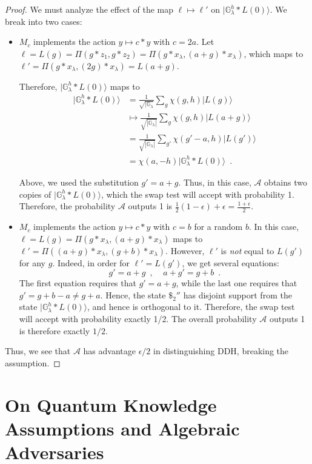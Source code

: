 \documentclass{article}\usepackage[a4paper,margin=20mm]{geometry}
\numberwithin{theorem}{section}
\numberwithin{equation}{section}
\newcommand{\G}{\mathbb{G}}
\newcommand{\As}{{\mathcal{A}}}
\begin{document}
\begin{proof}
	We must analyze the effect of the map $\ell\mapsto\ell'$ on $|\G_\lambda^{h}*L(0)\rangle$. We break into two cases:
	\begin{itemize}
		\item $M_c$ implements the action $y\mapsto c*y$ with $c=2a$. Let $\ell=L(g)=\Pi(g*z_1,g*z_2)=\Pi(g*x_\lambda,(a+g)*x_\lambda)$, which maps to $\ell'=\Pi(g*x_\lambda,(2g)*x_\lambda)=L(a+g)$.
		
		Therefore, $|\G_\lambda^{h}*L(0)\rangle$ maps to
		\begin{align*}|\G_\lambda^{h}*L(0)\rangle&=\frac{1}{\sqrt{|\G_\lambda}}\sum_g \chi(g,h)|L(g)\rangle\\&\mapsto\frac{1}{\sqrt{|\G_\lambda|}}\sum_g \chi(g,h)|L(a+g)\rangle\\&=\frac{1}{\sqrt{|\G_\lambda|}}\sum_{g'} \chi(g'-a,h)|L(g')\rangle\\&=\chi(a,-h)|\G_\lambda^{h}*L(0)\rangle\enspace .\end{align*}
		
		Above, we used the substitution $g'=a+g$. Thus, in this case, $\As$ obtains two copies of $|\G_\lambda^{h}*L(0)\rangle$, which the swap test will accept with probability 1. Therefore, the probability $\As$ outputs 1 is $\frac{1}{2}(1-\epsilon)+\epsilon=\frac{1+\epsilon}{2}$.
		
		
		\item $M_c$ implements the action $y\mapsto c*y$ with $c=b$ for a random $b$. In this case, $\ell=L(g)=\Pi(g*x_\lambda,(a+g)*x_\lambda)$ maps to $\ell'=\Pi((a+g)*x_\lambda,(g+b)*x_\lambda)$. However, $\ell'$ is \emph{not} equal to $L(g')$ for any $g$. Indeed, in order for $\ell'=L(g')$, we get several equations:
		\[g'=a+g\enspace ,\;\;\;\;a+g'=g+b\enspace .\]
		The first equation requires that $g'=a+g$, while the last one requires that $g'=g+b-a\neq g+a$. Hence, the state $\$_2''$ has disjoint support from the state $|\G_\lambda^{h}*L(0)\rangle$, and hence is orthogonal to it. Therefore, the swap test will accept with probability exactly 1/2. The overall probability $\As$ outputs 1 is therefore exactly $1/2$.
	\end{itemize}
	Thus, we see that $\As$ has advantage $\epsilon/2$ in distinguishing DDH, breaking the assumption.
\end{proof}






\section{On Quantum Knowledge Assumptions and Algebraic Adversaries}\label{sec:knowledge}
\end{document}
